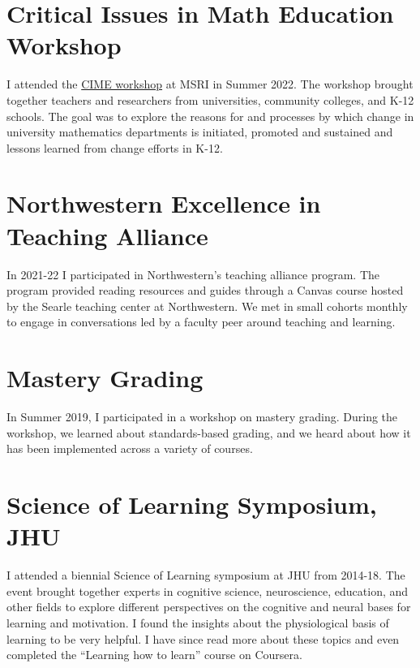\documentclass[
]{report}
\begin{document}
\hypertarget{critical-issues-in-math-education-workshop}{%
\section{Critical Issues in Math Education Workshop}\label{critical-issues-in-math-education-workshop}}

I attended the \href{https://www.msri.org/workshops/1028}{CIME workshop} at MSRI in Summer 2022.
The workshop brought together teachers and researchers from universities, community colleges, and K-12 schools. The goal was to explore the reasons for and processes by which change in university mathematics departments is initiated, promoted and sustained and lessons learned from change efforts in K-12.

\hypertarget{northwestern-excellence-in-teaching-alliance}{%
\section{Northwestern Excellence in Teaching Alliance}\label{northwestern-excellence-in-teaching-alliance}}

In 2021-22 I participated in Northwestern's teaching alliance program.
The program provided reading resources and guides through a Canvas course hosted by the Searle teaching center at Northwestern.
We met in small cohorts monthly to engage in conversations led by a faculty peer around teaching and learning.

\hypertarget{mastery-grading}{%
\section{Mastery Grading}\label{mastery-grading}}

In Summer 2019, I participated in a workshop on mastery grading.
During the workshop, we learned about standards-based grading, and we heard about how it has been implemented across a variety of courses.

\hypertarget{science-of-learning-symposium-jhu}{%
\section{Science of Learning Symposium, JHU}\label{science-of-learning-symposium-jhu}}

I attended a biennial Science of Learning symposium at JHU from 2014-18.
The event brought together experts in cognitive science, neuroscience, education, and other fields to explore different perspectives on the cognitive and neural bases for learning and motivation.
I found the insights about the physiological basis of learning to be very helpful.
I have since read more about these topics and even completed the ``Learning how to learn'' course on Coursera.
\end{document}
